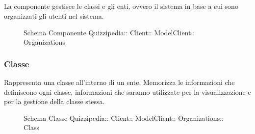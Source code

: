 \subsection{}
La componente gestisce le classi e gli enti, ovvero il sistema in base a cui sono organizzati gli utenti nel sistema.
\begin{figure}[H]
\centering
\noindent{}
\caption[Schema Componente Quizzipedia::Client::ModelClient::Organizations]{Schema Componente Quizzipedia:: Client:: ModelClient:: Organizations}
\end{figure}
\subsubsection{Classe }
Rappresenta una classe all'interno di un ente. Memorizza le informazioni che definiscono ogni classe,
informazioni che saranno utilizzate per la visualizzazione e per la gestione della classe stessa.
\begin{figure}[H]
\centering
\noindent{}
\caption[Schema Classe Class]{Schema Classe Quizzipedia:: Client:: ModelClient:: Organizations:: Class}
\end{figure}
